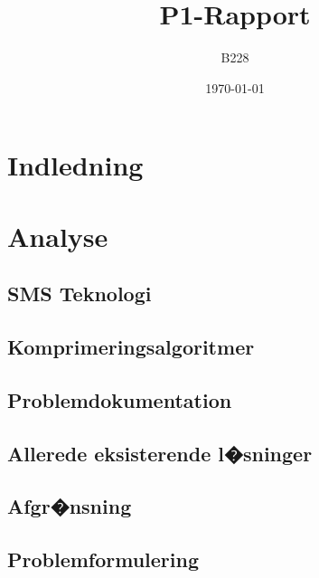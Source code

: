 \documentclass[12pt]{report}
\begin{document}



\title{P1-Rapport}
\author{B228}
\date{\today}
\pagebreak
\maketitle

\tableofcontents

\renewcommand{\chaptername}{Kapitel}

\chapter{Indledning}

\chapter{Analyse}

	\section{SMS Teknologi}
	
	\clearpage
	
	\section{Komprimeringsalgoritmer}
	
	\clearpage
	
	\section{Problemdokumentation}
	
	\clearpage

	\section{Allerede eksisterende l�sninger}
	
	\clearpage

	\section{Afgr�nsning}
	
	\clearpage
	
	\section{Problemformulering}
	
\end{document}

